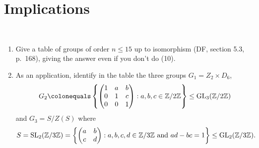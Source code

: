 \newpage
\section{Implications}~\label{sec:impl}

\begin{Answer}
  \begin{enumerate}
    \item Give a table of groups of order $n\leq 15$ up to isomorphism (DF, section 
    5.3, p.~168), giving the answer even if you don't do (10).
    \item As an application, identify in the table the three groups $G_1=Z_2 \times 
    D_6$, 
    \[ G_2 \colonequals
      \left\{ \begin{pmatrix}
        1 & a & b \\
        0 & 1 & c \\
        0 & 0 & 1
      \end{pmatrix} : a,b,c \in \Z/2\Z \right\} \leq \GL_3(\Z/2\Z) \]
    and $G_3=S/Z(S)$ where  
    \[ S=\operatorname{SL}_2(\mathbb{Z}/3\mathbb{Z})=\left\{ \begin{pmatrix} a & b \\ c & d \end{pmatrix} : a,b,c,d
    \in \mathbb{Z}/3\mathbb{Z} \text{ and } ad-bc=1 \right\} \leq \mathrm{GL}_2(\mathbb{Z}/3\mathbb{Z}). \]
  \end{enumerate}
\end{Answer}

